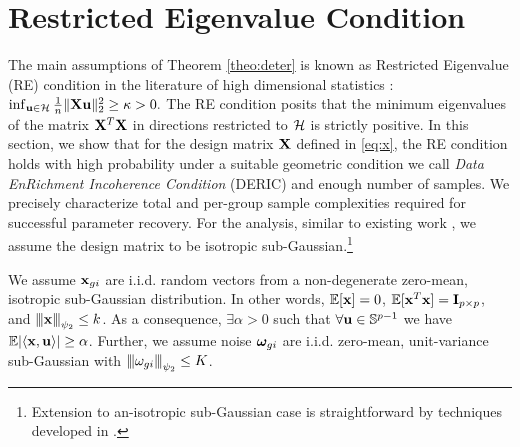 \section{Restricted Eigenvalue Condition}
\label{sec:re}
The main assumptions of Theorem \ref{theo:deter} is known as Restricted Eigenvalue (RE) condition in the literature of high dimensional statistics \cite{banerjee14, nrwy12, raskutti10}:
$\inf_{\mathbf{u} \in {\cal H}} \frac{1}{n} \|\mathbf{X} \mathbf{u}\|_{2}^2 \geq \kappa > 0.$
The RE condition posits that the minimum eigenvalues of the matrix $\mathbf{X}^T \mathbf{X}$ in directions restricted to ${\cal H}$ is strictly positive.
In this section, we show that for the design matrix $\mathbf{X}$ defined in \eqref{eq:x}, the RE condition holds with high probability under a suitable geometric condition we call {\em Data EnRichment Incoherence Condition} (DERIC) and enough number of samples.
We precisely characterize total and per-group sample complexities required for successful parameter recovery.
For the analysis, similar to existing work \cite{trop15, mend15, guba16}, we assume the design matrix to be isotropic sub-Gaussian.\footnote{Extension to an-isotropic sub-Gaussian case is straightforward by techniques developed in \cite{banerjee14, ruzh13}.}
\begin{definition}
	\label{def:obs}
	We assume $\mathbf{x}_{gi}$ are i.i.d. random vectors from a non-degenerate zero-mean, isotropic sub-Gaussian distribution. In other words, $\mathbb{E} [\mathbf{x}] = 0$, $\mathbb{E} [\mathbf{x}^T \mathbf{x}] = \mathbf{I}_{p \times p}$, and ${\left\vert\kern-0.25ex\left\vert\kern-0.25ex\left\vert \mathbf{x} \right\vert\kern-0.25ex\right\vert\kern-0.25ex\right\vert}_{\psi_2} \leq k$.	
As a consequence, $\exists \alpha > 0$ such that $\forall \mathbf{u} \in \mathbb S^{p-1}$ we have $ \mathbb{E}|\langle \mathbf{x}, \mathbf{u} \rangle| \geq \alpha$. Further, we assume noise $\boldsymbol{\omega}_{gi} $ are i.i.d.
zero-mean, unit-variance sub-Gaussian with ${\left\vert\kern-0.25ex\left\vert\kern-0.25ex\left\vert \omega_{gi} \right\vert\kern-0.25ex\right\vert\kern-0.25ex\right\vert}_{\psi_2} \leq K$.
\end{definition}



